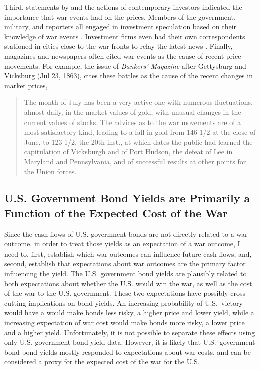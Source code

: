 Third, statements by and the actions of contemporary investors indicated the importance that war events had on the prices. %
Members of the government, military, and reporters all engaged in investment speculation based on their knowledge of war events \parencites[5-7]{Cornwallis1879}{Mitchell1903}[][1004]{WillardGuinnaneEtAl1996}.
Investment firms even had their own correspondents stationed in cities close to the war fronts to relay the latest news \parencites[5-7]{Cornwallis1879}. %
Finally, magazines and newspapers often cited war events as the cause of recent price movements. %
For example, the issue of \textit{Bankers' Magazine} after Gettysburg and Vicksburg (Jul 23, 1863), cites these battles as the cause of the recent changes in market prices,
=\begin{quote}
  The month of July has been a very active one with numerous fluctuations, almost daily, in the market values of gold, with unusual changes in the current values of stocks. %
  The advices as to the war movements are of a most satisfactory kind, leading to a fall in gold from 146 1/2 at the close of June, to 123 1/2, the 20th inst., at which dates the public had learned the  capitulation of Vicksburgh and of Port Hudson, the defeat of Lee in  Maryland and Pennsylvania, and of successful results at other points  for the Union forces. %
\parencite[159]{BankersMagazine1864}
\end{quote}



\subsection{U.S. Government Bond Yields are Primarily a Function of the Expected Cost of the War}
\label{sec:u.s.-governm-inter}

Since the cash flows of U.S. government bonds are not directly related to a war outcome, in order to treat those yields as an expectation of a war outcome, I need to, first, establish which war outcomes can influence future cash flows, and, second, establish that expectations about war outcomes are the primary factor influencing the yield.
The U.S. government bond yields are plausibly related to both expectations about whether the U.S. would win the war, as well as the cost of the war to the U.S. government.
These two expectations have possibly cross-cutting implications on bond yields.
An increasing probability of U.S.\ victory would have a would make bonds less risky, a higher price and lower yield, while a increasing expectation of war cost would make bonds more risky, a lower price and a higher yield.
Unfortunately, it is not possible to separate these effects using only U.S. government bond yield data.
However, it is likely that U.S.\ government bond bond yields mostly responded to expectations about war costs, and can be considered a proxy for the expected cost of the war for the U.S.

